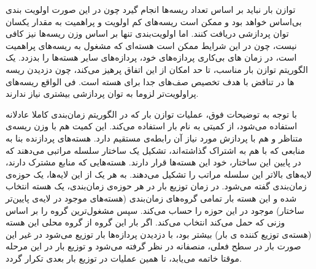 توازن بار نباید بر اساس تعداد ریسه‌ها انجام گیرد چون در این صورت اولویت بندی بی‌اساس خواهد بود و ممکن است ریسه‌های کم اولویت و پراهمیت به مقدار یکسان توان پردازشی دریافت کنند. اما اولویت‌بندی تنها بر اساس وزن ریسه‌ها نیز کافی نیست، چون در این شرایط ممکن است هسته‌ای که مشغول به ریسه‌های پراهمیت است، در زمان های بی‌کاری پردازه‌های خود، پردازه‌های سایر هسته‌ها را بدزدد. یک الگوریتم توازن بار مناسب، تا حد امکان از این اتفاق پرهیز می‌کند، چون دزدیدن ریسه ها در تناقض با هدف تخصیص صف‌های جدا برای هسته است. فی الواقع ریسه‌های پراولویت‌تر لزوما به توان پردازشی بیشتری نیاز ندارند.

با توجه به توضیحات فوق، عملیات توازن بار که در الگوریتم زمان‌بندی کاملا عادلانه استفاده می‌شود، از کمیتی به نام بار
استفاده می‌کند. این کمیت هم با وزن ریسه‌ی متناظر و هم با پردازش مورد نیاز آن رابطه‌ی مستقیم دارد. هسته‌های
پردازنده بنا به منابعی که با هم به اشتراک گذاشته‌اند، تشکیل یک ساختار سلسله مراتبی
می‌دهند که در پایین این ساختار، خود این هسته‌ها قرار دارند. هسته‌هایی که منابع مشترک دارند، لایه‌های بالاتر این سلسله مراتب را تشکیل می‌دهند. به هر یک از این لایه‌ها، یک حوزه‌ی زمان‌بندی
گفته می‌شود. در زمان توزیع بار در هر حوزه‌ی زمان‌بندی، یک هسته انتخاب شده و این هسته بار تمامی گروه‌های زمان‌بندی (هسته‌های موجود در لایه‌ی پایین‌تر ساختار) موجود در این حوزه را حساب می‌کند. سپس مشغول‌ترین گروه را بر اساس وزنی که حمل می‌کند انتخاب می‌کند. اگر بار این گروه از گروه محلی این هسته (هسته‌ی توزیع کننده ی بار) بیشتر بود، با دزدیدن پردازه‌ها بار توزیع می‌شود در غیر این صورت بار در سطح فعلی، منصفانه در نظر گرفته می‌شود و توزیع بار در این مرحله موقتا خاتمه می‌یابد، تا همین عملیات در توزیع بار بعدی تکرار گردد.